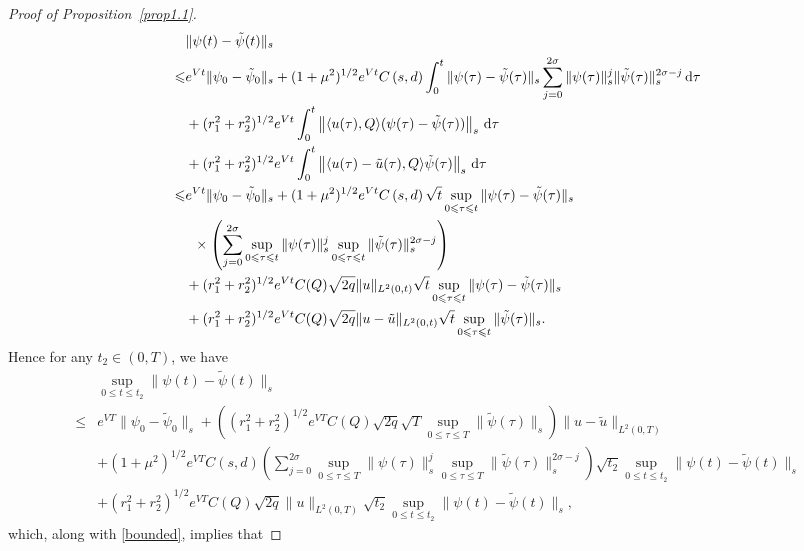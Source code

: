 \documentclass[review]{elsarticle}
\theoremstyle{dotless}
\def\d{{\,\rm d}}
\def \leq{\leqslant}
\numberwithin{equation}{section}
\begin{document}
\begin{proof}[Proof of Proposition~\ref{prop1.1}]
	\begin{equation*}
		\begin{aligned}
			&\|\psi(t)-\tilde{\psi}(t)\|_{s}  \\
			\leq & e^{Vt} \| \psi_0-\tilde{\psi}_0 \|_{s} + (1+ \mu^2)^{1/2} e^{Vt}C\left(s,d\right)\int_0^t\|\psi(\tau)-\tilde{\psi}(\tau)\|_s \sum_{j=0}^{2\sigma}\|\psi(\tau)\|_s^j\|\tilde{\psi}(\tau)\|_s^{2\sigma-j}\d\tau \\
			&+(r_1^2+r_2^2)^{1/2}e^{Vt}\int_0^t\left\|\langle u(\tau),Q\rangle(\psi(\tau)-\tilde{\psi}(\tau)) \right\|_s\d\tau\\
			&+(r_1^2+r_2^2)^{1/2}e^{Vt}\int_0^t\left\|\langle u(\tau)-\tilde{u}(\tau),Q\rangle\tilde{\psi}(\tau)\right\|_s\d\tau\\
			\leq & e^{Vt} \| \psi_0-\tilde{\psi}_0 \|_{s} + (1+ \mu^2)^{1/2} e^{Vt}C\left(s,d\right)\sqrt{t}\sup _{0 \leq \tau \leq t}\|\psi(\tau)-\tilde{\psi}(\tau)\|_{s}\\
			&\;\;\times\left(\sum_{j=0}^{2\sigma} \sup _{0 \leq \tau \leq t}\|\psi(\tau)\|_{s}^j \sup _{0 \leq \tau \leq t}\|\tilde{\psi}(\tau)\|_{s}^{2\sigma-j}\right) \\
			&+(r_1^2+r_2^2)^{1/2}e^{Vt}C(Q)\sqrt{2q}\|u\|_{L^2(0,t)}\sqrt{t}\sup _{0 \leq \tau \leq t}\|\psi(\tau)-\tilde{\psi}(\tau)\|_{s}\\
			&+(r_1^2+r_2^2)^{1/2}e^{Vt}C(Q)\sqrt{2q}\|u-\tilde{u}\|_{L^2(0,t)}\sqrt{t}\sup _{0 \leq \tau \leq t}\| \tilde{\psi}(\tau)\|_{s} .
		\end{aligned}
	\end{equation*}
	Hence for any $t_2\in(0,T)$, we have
	\begin{equation*}
		\begin{aligned}
			&\sup _{0 \leq t \leq t_2}\|\psi(t)-\tilde{\psi}(t)\|_{s} \\ \leq & e^{VT}  \|\psi_0-\tilde{\psi}_0 \|_{s}+\left((r_1^2+r_2^2)^{1/2}e^{VT}C(Q)\sqrt{2q}\sqrt{T}\sup _{0 \leq \tau \leq T}\| \tilde{\psi}(\tau)\|_{s}\right)\|u-\tilde{u}\|_{L^2(0,T)}  \\
			& + (1+ \mu^2)^{1/2} e^{VT}C\left(s,d\right) \left(\sum_{j=0}^{2\sigma} \sup _{0 \leq \tau \leq T}\|\psi(\tau)\|_{s}^j \sup _{0 \leq \tau \leq T}\|\tilde{\psi}(\tau)\|_{s}^{2\sigma-j}\right)\sqrt{t_2} \sup _{0 \leq t \leq t_2}\|\psi(t)-\tilde{\psi}(t)\|_{s} \\
			&+ (r_1^2+r_2^2)^{1/2}e^{VT}C(Q)\sqrt{2q}\|u\|_{L^2(0,T)}\sqrt{t_2}\sup _{0 \leq t \leq t_2}\|\psi(t)-\tilde{\psi}(t)\|_{s},
		\end{aligned}
	\end{equation*}which, along with \eqref{bounded}, implies that

\end{proof}
\end{document}
